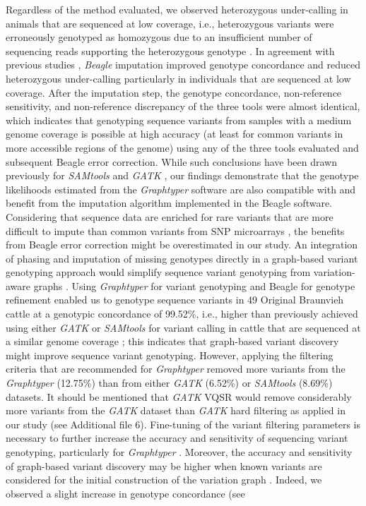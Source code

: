 \documentclass[../main.tex]{subfiles}
\begin{document}
Regardless of the method evaluated, we observed heterozygous under-calling in animals that are sequenced at low coverage, i.e., heterozygous variants were erroneously genotyped as homozygous due to an insufficient number of sequencing reads supporting the heterozygous genotype \citep{nielsen2011genotype,sims2014sequencing,fragoso2016imputing,bilton2018linkage}. In agreement with previous studies \citep{Jansen2013,Daetwyler2014}, \emph{Beagle} imputation improved genotype concordance and reduced heterozygous under-calling particularly in individuals that are sequenced at low coverage. After the imputation step, the genotype concordance, non-reference sensitivity, and non-reference discrepancy of the three tools were almost identical, which indicates that genotyping sequence variants from samples with a medium genome coverage is possible at high accuracy (at least for common variants in more accessible regions of the genome) using any of the three tools evaluated and subsequent Beagle error correction. While such conclusions have been drawn previously for \emph{SAMtools} and \emph{GATK} \citep{Jansen2013,baes2014evaluation}, our findings demonstrate that the genotype likelihoods estimated from the \emph{Graphtyper} software are also compatible with and benefit from the imputation algorithm implemented in the Beagle software. Considering that sequence data are enriched for rare variants that are more difficult to impute than common variants from SNP microarrays \citep{pausch2017evaluation}, the benefits from Beagle error correction might be overestimated in our study. An integration of phasing and imputation of missing genotypes directly in a graph-based variant genotyping approach would simplify sequence variant genotyping from variation-aware graphs \citep{rakocevic2019fast,siren2020haplotype,novak2017graph}. Using \emph{Graphtyper} for variant genotyping and Beagle for genotype refinement enabled us to genotype sequence variants in 49 Original Braunvieh cattle at a genotypic concordance of 99.52\%, i.e., higher than previously achieved using either \emph{GATK} or \emph{SAMtools} for variant calling in cattle that are sequenced at a similar genome coverage \citep{Jansen2013,Stothard2015,Boussaha2016,Daetwyler2014,baes2014evaluation,stafuzza2017single}; this indicates that graph-based variant discovery might improve sequence variant genotyping. However, applying the filtering criteria that are recommended for \emph{Graphtyper} \citep{eggertsson2017graphtyper} removed more variants from the \emph{Graphtyper} (12.75\%) than from either \emph{GATK} (6.52\%) or \emph{SAMtools} (8.69\%) datasets. It should be mentioned that \emph{GATK} VQSR would remove considerably more variants from the \emph{GATK} dataset than \emph{GATK} hard filtering as applied in our study (see Additional file 6). Fine-tuning of the variant filtering parameters is necessary to further increase the accuracy and sensitivity of sequencing variant genotyping, particularly for \emph{Graphtyper} \citep{carson2014effective,jun2015efficient}. Moreover, the accuracy and sensitivity of graph-based variant discovery may be higher when known variants are considered for the initial construction of the variation graph \citep{eggertsson2017graphtyper}. Indeed, we observed a slight increase in genotype concordance (see 
\end{document}

